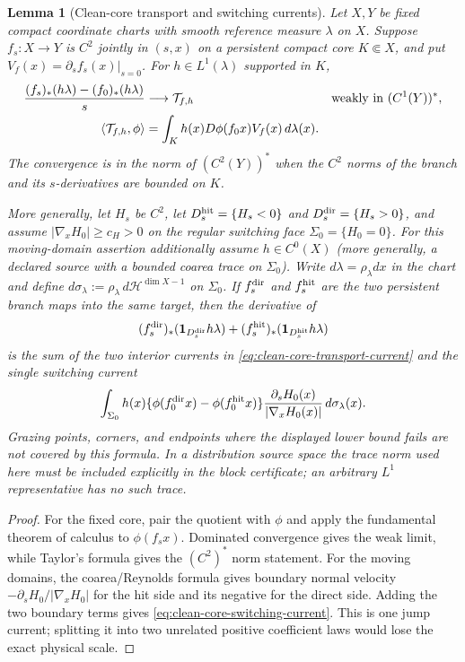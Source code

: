 \documentclass[11pt]{article}
\newtheorem{lemma}[theorem]{Lemma}
\newcommand{\one}{\mathbf 1}
\begin{document}
\begin{lemma}[Clean-core transport and switching currents]
\label{lem:fixed-section-clean-core-block-current}
Let $X,Y$ be fixed compact coordinate charts with smooth reference measure
$\lambda$ on $X$.  Suppose $f_s:X\to Y$ is $C^2$ jointly in $(s,x)$ on a
persistent compact core $K\Subset X$, and put
$V_f(x)=\partial_sf_s(x)|_{s=0}$.  For $h\in L^1(\lambda)$ supported in $K$,
\begin{align}
 \frac{(f_s)_*(h\lambda)-(f_0)_*(h\lambda)}s
 &\longrightarrow \mathcal T_{f,h}
 &&\hbox{weakly in }(C^1(Y))^*,
 \label{eq:clean-core-transport-current}\\
 \langle\mathcal T_{f,h},\phi\rangle
 &=\int_Kh(x)D\phi(f_0x)V_f(x)\,d\lambda(x).
 \label{eq:clean-core-transport-pairing}
\end{align}
The convergence is in the norm of $(C^2(Y))^*$ when the $C^2$ norms of the
branch and its $s$-derivatives are bounded on $K$.

More generally, let $H_s$ be $C^2$, let
$D_s^{\rm hit}=\{H_s<0\}$ and
$D_s^{\rm dir}=\{H_s>0\}$, and assume
$|\nabla_xH_0|\ge c_H>0$ on the regular switching face
$\Sigma_0=\{H_0=0\}$.  For this moving-domain assertion additionally assume
$h\in C^0(X)$ (more generally, a declared source with a bounded coarea trace
on $\Sigma_0$).  Write $d\lambda=\rho_\lambda dx$ in the chart and define
$d\sigma_\lambda:=\rho_\lambda\,d\mathcal H^{\dim X-1}$ on $\Sigma_0$.
If $f_s^{\rm dir}$ and $f_s^{\rm hit}$ are the two persistent branch maps
into the same target, then the derivative of
\[
 (f_s^{\rm dir})_*(\one_{D_s^{\rm dir}}h\lambda)
 +(f_s^{\rm hit})_*(\one_{D_s^{\rm hit}}h\lambda)
\]
is the sum of the two interior currents in
\eqref{eq:clean-core-transport-current} and the single switching current
\begin{equation}
\label{eq:clean-core-switching-current}
 \int_{\Sigma_0}h(x)
 \{\phi(f_0^{\rm dir}x)-\phi(f_0^{\rm hit}x)\}
 \frac{\partial_sH_0(x)}{|\nabla_xH_0(x)|}
 \,d\sigma_\lambda(x).
\end{equation}
Grazing points, corners, and endpoints where the displayed lower bound fails
are not covered by this formula.  In a distribution source space the trace
norm used here must be included explicitly in the block certificate; an
arbitrary $L^1$ representative has no such trace.
\end{lemma}

\begin{proof}
For the fixed core, pair the quotient with $\phi$ and apply the fundamental
theorem of calculus to $\phi(f_sx)$.  Dominated convergence gives the weak
limit, while Taylor's formula gives the $(C^2)^*$ norm statement.  For the
moving domains, the coarea/Reynolds formula gives boundary normal velocity
$-\partial_sH_0/|\nabla_xH_0|$ for the hit side and its negative for the
direct side.  Adding the two boundary terms gives
\eqref{eq:clean-core-switching-current}.  This is one jump current; splitting
it into two unrelated positive coefficient laws would lose the exact
physical scale.
\end{proof}
\end{document}
